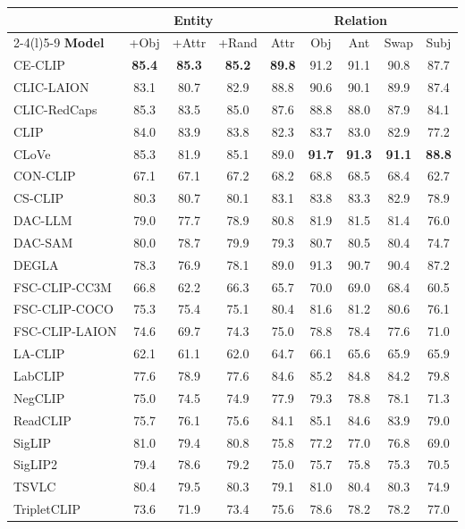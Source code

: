 \begin{tabular}{@{}lccc|ccccc@{}}
\toprule
& \multicolumn{3}{c|}{\textbf{Entity}} & \multicolumn{5}{c}{\textbf{Relation}} \\
\cmidrule(r){2-4}\cmidrule(l){5-9}
\textbf{Model} & +Obj & +Attr & +Rand & Attr & Obj & Ant & Swap & Subj \\
\midrule
CE-CLIP & \textbf{85.4} & \textbf{85.3} & \textbf{85.2} & \textbf{89.8} & 91.2 & 91.1 & 90.8 & 87.7 \\
CLIC-LAION & 83.1 & 80.7 & 82.9 & 88.8 & 90.6 & 90.1 & 89.9 & 87.4 \\
CLIC-RedCaps & 85.3 & 83.5 & 85.0 & 87.6 & 88.8 & 88.0 & 87.9 & 84.1 \\
CLIP & 84.0 & 83.9 & 83.8 & 82.3 & 83.7 & 83.0 & 82.9 & 77.2 \\
CLoVe & 85.3 & 81.9 & 85.1 & 89.0 & \textbf{91.7} & \textbf{91.3} & \textbf{91.1} & \textbf{88.8} \\
CON-CLIP & 67.1 & 67.1 & 67.2 & 68.2 & 68.8 & 68.5 & 68.4 & 62.7 \\
CS-CLIP & 80.3 & 80.7 & 80.1 & 83.1 & 83.8 & 83.3 & 82.9 & 78.9 \\
DAC-LLM & 79.0 & 77.7 & 78.9 & 80.8 & 81.9 & 81.5 & 81.4 & 76.0 \\
DAC-SAM & 80.0 & 78.7 & 79.9 & 79.3 & 80.7 & 80.5 & 80.4 & 74.7 \\
DEGLA & 78.3 & 76.9 & 78.1 & 89.0 & 91.3 & 90.7 & 90.4 & 87.2 \\
FSC-CLIP-CC3M & 66.8 & 62.2 & 66.3 & 65.7 & 70.0 & 69.0 & 68.4 & 60.5 \\
FSC-CLIP-COCO & 75.3 & 75.4 & 75.1 & 80.4 & 81.6 & 81.2 & 80.6 & 76.1 \\
FSC-CLIP-LAION & 74.6 & 69.7 & 74.3 & 75.0 & 78.8 & 78.4 & 77.6 & 71.0 \\
LA-CLIP & 62.1 & 61.1 & 62.0 & 64.7 & 66.1 & 65.6 & 65.9 & 65.9 \\
LabCLIP & 77.6 & 78.9 & 77.6 & 84.6 & 85.2 & 84.8 & 84.2 & 79.8 \\
NegCLIP & 75.0 & 74.5 & 74.9 & 77.9 & 79.3 & 78.8 & 78.1 & 71.3 \\
ReadCLIP & 75.7 & 76.1 & 75.6 & 84.1 & 85.1 & 84.6 & 83.9 & 79.0 \\
SigLIP & 81.0 & 79.4 & 80.8 & 75.8 & 77.2 & 77.0 & 76.8 & 69.0 \\
SigLIP2 & 79.4 & 78.6 & 79.2 & 75.0 & 75.7 & 75.8 & 75.3 & 70.5 \\
TSVLC & 80.4 & 79.5 & 80.3 & 79.1 & 81.0 & 80.4 & 80.3 & 74.9 \\
TripletCLIP & 73.6 & 71.9 & 73.4 & 75.6 & 78.6 & 78.2 & 78.2 & 77.0 \\
\bottomrule
\end{tabular}